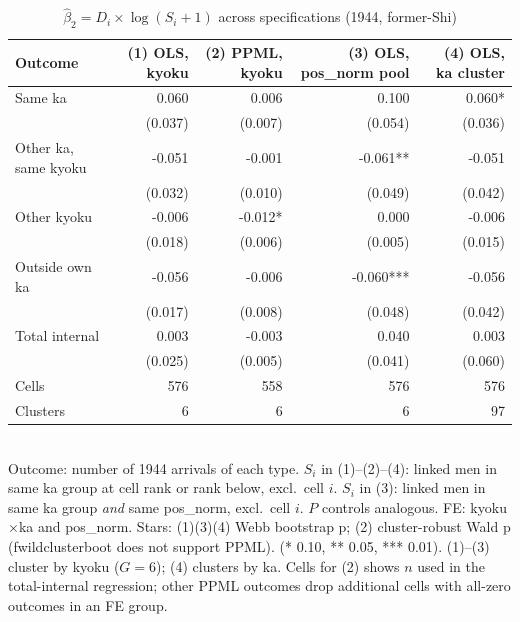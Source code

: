\begin{table}[!htbp]
  \centering
  \caption{$\hat{\beta}_2 = D_i \times \log(S_i+1)$ across specifications (1944, former-Shi)}
  \label{tab:b2_4specs}
  \begin{tabular}{lrrrr}
    \hline\hline
    Outcome & (1) OLS, kyoku & (2) PPML, kyoku & (3) OLS, pos\_norm pool & (4) OLS, ka cluster \\
    \hline
    Same ka & 0.060 & 0.006 & 0.100 & 0.060* \\
     & (0.037) & (0.007) & (0.054) & (0.036) \\
    Other ka, same kyoku & -0.051 & -0.001 & -0.061** & -0.051 \\
     & (0.032) & (0.010) & (0.049) & (0.042) \\
    Other kyoku & -0.006 & -0.012* & 0.000 & -0.006 \\
     & (0.018) & (0.006) & (0.005) & (0.015) \\
    Outside own ka & -0.056 & -0.006 & -0.060*** & -0.056 \\
     & (0.017) & (0.008) & (0.048) & (0.042) \\
    Total internal & 0.003 & -0.003 & 0.040 & 0.003 \\
     & (0.025) & (0.005) & (0.041) & (0.060) \\
    \hline
    Cells & 576 & 558 & 576 & 576 \\
    Clusters & 6 & 6 & 6 & 97 \\
    \hline\hline
  \end{tabular}
  \\[4pt]
  \footnotesize
  Outcome: number of 1944 arrivals of each type.
  $S_i$ in (1)--(2)--(4): linked men in same ka group at cell rank or rank below, excl.~cell $i$.
  $S_i$ in (3): linked men in same ka group \emph{and} same pos\_norm, excl.~cell $i$.
  $P$ controls analogous.
  FE: kyoku$\times$ka and pos\_norm.
  Stars: (1)(3)(4) Webb bootstrap p; (2) cluster-robust Wald p (fwildclusterboot does not support PPML).
  (* 0.10, ** 0.05, *** 0.01). (1)--(3) cluster by kyoku ($G=6$); (4) clusters by ka.
  Cells for (2) shows $n$ used in the total-internal regression;
  other PPML outcomes drop additional cells with all-zero outcomes in an FE group.
\end{table}
